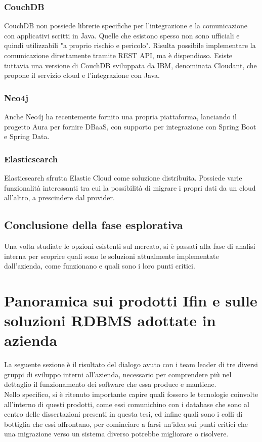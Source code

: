 \subsubsection{CouchDB}
CouchDB non possiede librerie specifiche per l'integrazione e la comunicazione con applicativi scritti in Java. Quelle che esistono spesso non sono ufficiali e quindi utilizzabili "a proprio rischio e pericolo". Risulta possibile implementare la comunicazione direttamente tramite REST API, ma è dispendioso.
Esiste tuttavia una versione di CouchDB sviluppata da IBM, denominata Cloudant, che propone il servizio cloud e l'integrazione con Java.

\subsubsection{Neo4j}
Anche Neo4j ha recentemente fornito una propria piattaforma, lanciando il progetto Aura per fornire DBaaS, con supporto per integrazione con Spring Boot e Spring Data.

\subsubsection{Elasticsearch}
Elasticsearch sfrutta Elastic Cloud come soluzione distribuita.
Possiede varie funzionalità interessanti tra cui la possibilità di migrare i propri dati da un cloud all'altro, a prescindere dal provider.

\subsection{Conclusione della fase esplorativa}
Una volta studiate le opzioni esistenti sul mercato, si è passati alla fase di analisi interna per scoprire quali sono le soluzioni attualmente implementate dall'azienda, come funzionano e quali sono i loro punti critici.

\section{Panoramica sui prodotti Ifin e sulle soluzioni RDBMS adottate in azienda}

La seguente sezione è il risultato del dialogo avuto con i team leader di tre diversi gruppi di sviluppo interni all'azienda, necessario per comprendere più nel dettaglio il funzionamento dei software che essa produce e mantiene.\\
Nello specifico, si è ritenuto importante capire quali fossero le tecnologie coinvolte all'interno di questi prodotti, come essi comunichino con i database che sono al centro delle dissertazioni presenti in questa tesi, ed infine quali sono i colli di bottiglia che essi affrontano, per cominciare a farsi un'idea sui punti critici che una migrazione verso un sistema diverso potrebbe migliorare o risolvere.\\

